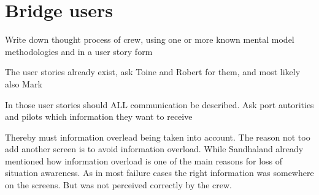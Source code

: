
\section{Bridge users}
Write down thought process of crew, using one or more known mental model methodologies and in a user story form

The user stories already exist, ask Toine and Robert for them, and most likely also Mark


In those user stories should ALL communication be described. Ask port autorities and pilots which information they want to receive

Thereby must information overlead being taken into account. The reason not too add another screen is to avoid information overload. While Sandhaland already mentioned how information overload is one of the main reasons for loss of situation awareness. As in most failure cases the right information was somewhere on the screens. But was not perceived correctly by the crew.



